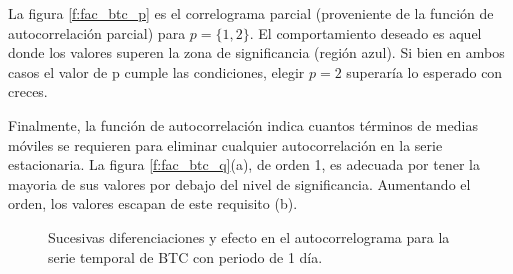 \documentclass[a4paper,10pt]{article}
\begin{document}
La figura \ref{f:fac_btc_p} es el correlograma parcial (proveniente de la función de autocorrelación parcial) para $p=\{1,2\}$. El comportamiento deseado es aquel donde los valores superen la zona de significancia (región azul). Si bien en ambos casos el valor de p cumple las condiciones, elegir $p=2$ superaría lo esperado con creces.

Finalmente, la función de autocorrelación indica cuantos términos de medias móviles se requieren para eliminar cualquier autocorrelación en la serie estacionaria. La figura \ref{f:fac_btc_q}(a), de orden 1, es adecuada por tener la mayoria de sus valores por debajo del nivel de significancia. Aumentando el orden, los valores escapan de este requisito (b).

\begin{figure}[H]
 \centering
  \caption{Sucesivas diferenciaciones y efecto en el autocorrelograma para la serie temporal de BTC con periodo de 1 día.}
  \label{f:btc_1d_diff-fac}
\end{figure}
\end{document}
